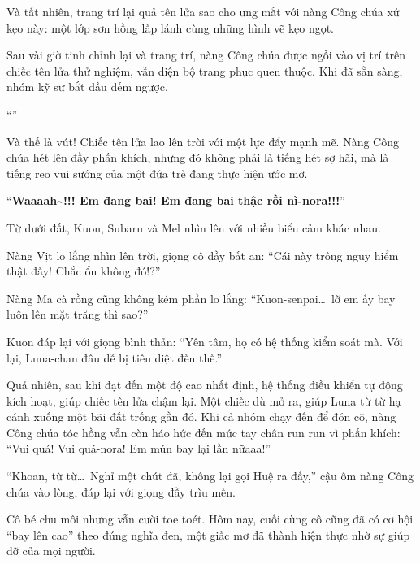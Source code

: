 \documentclass[../main.tex]{subfiles}
\begin{document}
Và tất nhiên, trang trí lại quả tên lửa sao cho ưng mắt với nàng Công chúa xứ kẹo này: một lớp sơn hồng lấp lánh cùng những hình vẽ kẹo ngọt.

\ct

Sau vài giờ tinh chỉnh lại và trang trí, nàng Công chúa được ngồi vào vị trí trên chiếc tên lửa thử nghiệm, vẫn diện bộ trang phục quen thuộc. Khi đã sẵn sàng, nhóm kỹ sư bắt đầu đếm ngược.

``''

Và thế là vút! Chiếc tên lửa lao lên trời với một lực đẩy mạnh mẽ. Nàng Công chúa hét lên đầy phấn khích, nhưng đó không phải là tiếng hét sợ hãi, mà là tiếng reo vui sướng của một đứa trẻ đang thực hiện ước mơ.

``\textbf{Waaaah\~{}!!! Em đang bai! Em đang bai thậc rồi nì-nora!!!}''


Từ dưới đất, Kuon, Subaru và Mel nhìn lên với nhiều biểu cảm khác nhau.

Nàng Vịt lo lắng nhìn lên trời, giọng cô đầy bất an: ``Cái này trông nguy hiểm thật đấy! Chắc ổn không đó!?''

Nàng Ma cà rồng cũng không kém phần lo lắng: ``Kuon-senpai\dots\ lỡ em ấy bay luôn lên mặt trăng thì sao?''

Kuon đáp lại với giọng bình thản: ``Yên tâm, họ có hệ thống kiểm soát mà. Với lại, Luna-chan đâu dễ bị tiêu diệt đến thế.''

Quả nhiên, sau khi đạt đến một độ cao nhất định, hệ thống điều khiển tự động kích hoạt, giúp chiếc tên lửa chậm lại. Một chiếc dù mở ra, giúp Luna từ từ hạ cánh xuống một bãi đất trống gần đó. Khi cả nhóm chạy đến để đón cô, nàng Công chúa tóc hồng vẫn còn háo hức đến mức tay chân run run vì phấn khích: ``Vui quá! Vui quá-nora! Em mún bay lại lần nữaaa!''

``Khoan, từ từ\dots\ Nghỉ một chút đã, không lại gọi Huệ ra đấy,'' cậu ôm nàng Công chúa vào lòng, đáp lại với giọng đầy trìu mến.

Cô bé chu môi nhưng vẫn cười toe toét. Hôm nay, cuối cùng cô cũng đã có cơ hội ``bay lên cao'' theo đúng nghĩa đen, một giấc mơ đã thành hiện thực nhờ sự giúp đỡ của mọi người.
\end{document}
